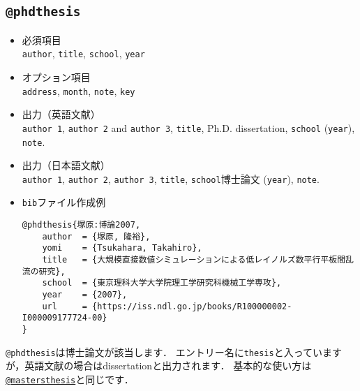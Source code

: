 \documentclass[a4paper,fleqn,uplatex,dvipdfmx]{jsarticle}
\begin{document}
\subsection{\texttt{@phdthesis}}
\label{ssec:phdthesis}
\begin{screen}
    \begin{itemize}
        \item 必須項目 \\
        \verb|author|, \verb|title|, \verb|school|, \verb|year|
        \item オプション項目 \\
        \verb|address|, \verb|month|, \verb|note|, \verb|key|
        \item 出力（英語文献） \\
            \colorbox[gray]{0.8}{\texttt{author 1}}, \colorbox[gray]{0.8}{\texttt{author 2}} and \colorbox[gray]{0.8}{\texttt{author 3}}, \colorbox[gray]{0.8}{\texttt{title}}, Ph.D. dissertation, \colorbox[gray]{0.8}{\texttt{school}} (\colorbox[gray]{0.8}{\texttt{year}}), \colorbox[gray]{0.8}{\texttt{note}}.
        \item 出力（日本語文献） \\
            \colorbox[gray]{0.8}{\texttt{author 1}}, \colorbox[gray]{0.8}{\texttt{author 2}}, \colorbox[gray]{0.8}{\texttt{author 3}}, \colorbox[gray]{0.8}{\texttt{title}}, \colorbox[gray]{0.8}{\texttt{school}}博士論文 (\colorbox[gray]{0.8}{\texttt{year}}), \colorbox[gray]{0.8}{\texttt{note}}.
        \item \verb|bib|ファイル作成例 \vspace{-3mm}
\begin{verbatim}
@phdthesis{塚原:博論2007,
    author  = {塚原, 隆裕},
    yomi    = {Tsukahara, Takahiro},
    title   = {大規模直接数値シミュレーションによる低レイノルズ数平行平板間乱流の研究},
    school  = {東京理科大学大学院理工学研究科機械工学専攻},
    year    = {2007},
    url     = {https://iss.ndl.go.jp/books/R100000002-I000009177724-00}
}
\end{verbatim}
    \end{itemize}
\end{screen}

\verb|@phdthesis|は博士論文が該当します．
エントリー名に\verb|thesis|と入っていますが，英語文献の場合はdissertationと出力されます．
基本的な使い方は\hyperref[ssec:mastersthesis]{\texttt{@mastersthesis}}と同じです．
\end{document}
